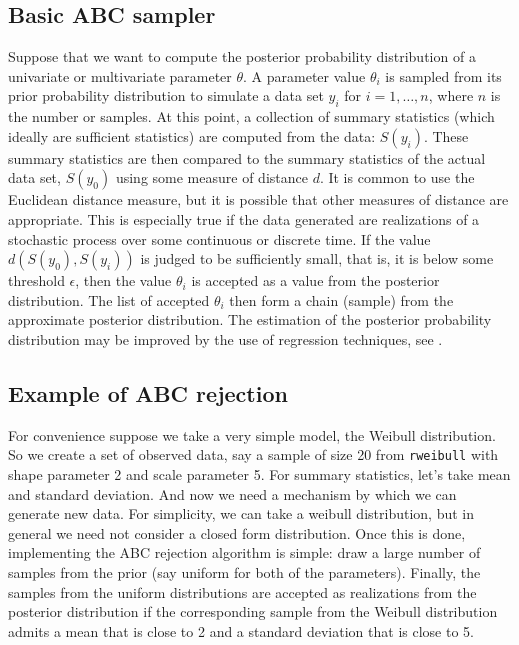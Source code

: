 \documentclass[12pt]{article}
\begin{document}
\subsection{Basic ABC sampler}



Suppose that we want to compute the posterior probability distribution of a univariate or multivariate parameter $\theta$. A parameter value $\theta_i$ is sampled from its prior probability distribution to simulate a data set $y_i$ for $i = 1, \ldots, n$, where $n$ is the number or samples. At this point, a collection of summary statistics (which ideally are sufficient statistics) are computed from the data: $S (y_i)$. These summary statistics are then compared to the summary statistics of the actual data set, $ S(y_0)$ using some measure of distance $d$. It is common to use the Euclidean distance measure, but it is possible that other measures of distance are appropriate. This is especially true if the data generated are realizations of a stochastic process over some continuous or discrete time. If the value $d (S (y_0), S(y_i))$ is judged to be sufficiently small, that is, it is below some threshold $\epsilon$, then the value $\theta_i$ is accepted as a value from the posterior distribution. The list of accepted $\theta_i$ then form a chain (sample) from the approximate posterior distribution. The estimation of the posterior probability distribution may be improved by the use of regression techniques, see \cite{abcr}.

\subsection{Example of ABC rejection}


For convenience suppose we take a very simple model, the Weibull distribution. So we create a set of observed data, say a sample of size 20 from \texttt{rweibull} with shape parameter 2 and scale parameter 5. For summary statistics, let's take mean and standard deviation. And now we need a mechanism by which we can generate new data. For simplicity, we can take a weibull distribution, but in general we need not consider a closed form distribution. Once this is done, implementing the ABC rejection algorithm is simple: draw a large number of samples from the prior (say uniform for both of the parameters). Finally, the samples from the uniform distributions are accepted as realizations from the posterior distribution if the corresponding sample from the Weibull distribution admits a mean that is close to 2 and a standard deviation that is close to 5. 
\end{document}
